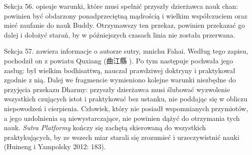 Sekcja 56. opisuje warunki, które musi spełnić przyszły dzierżawca nauk chan: powinien być obdarzony ponadprzeciętną mądrością i wielkim współczuciem oraz mieć zaufanie do nauk Buddy.
Otrzymawszy ten przekaz, powinien przekazać go dalej i dołożyć starań, by w późniejszych czasach linia nie została przerwana.

Sekcja 57. zawiera informacje o autorze sutry, mnichu Fahai. Według tego zapisu, pochodził on z powiatu Quxiang (曲江縣 ).
Po tym następuje pochwała jego zasług: był wielkim bodhisattwą, nauczał prawdziwej doktryny i praktykował zgodnie z nią.
Dalej we fragmencie wymieniono kolejne warunki niezbędne do przyjęcia przekazu Dharmy: przyszły dzierżawca musi ślubować wyzwolenie wszystkich czujących istot i praktykować bez ustanku, nie poddając się w obliczu niepowodzeń i cierpienia.
Człowiek, który nie posiadł wspomnianych przymiotów, a jego uzdolnienia są niewystarczające, nie powinien dążyć do otrzymania tych nauk.
\textit{Sutra Platformy} kończy się zachętą skierowaną do wszystkich praktykujących, by ze wszech miar starali się zrozumieć i urzeczywistnić nauki
(Huineng i Yampolsky 2012: 183).
